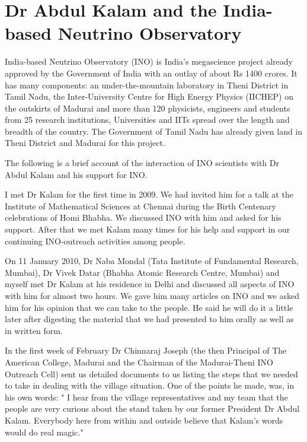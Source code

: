 \chapter{Dr Abdul Kalam and the India-based Neutrino Observatory}\label{chap19}


    

India-based Neutrino Observatory (INO) is India's megascience project
already approved by the Government of India with an outlay of about
Rs 1400 crores. It has many components: an under-the-mountain laboratory
in Theni District in Tamil Nadu, the Inter-University Centre for High
Energy Physics (IICHEP) on the outskirts of Madurai and more than 120
physicists, engineers and students from 25 research institutions, 
Universities and IITs spread over the length and breadth of the country.
The Government of Tamil Nadu has already given land in Theni District
and Madurai for this project.

The following is a brief account of the interaction of INO scientists with
Dr Abdul Kalam and his support for INO.

I met Dr Kalam for the first time in 2009. We had invited him for a talk
at the Institute of Mathematical Sciences at Chennai during the Birth 
Centenary celebrations of Homi Bhabha. We discussed INO with him and
asked for his support. After that we met Kalam many times for his help
and support in our continuing INO-outreach activities among people.

\vspace{.2cm}

On 11 January 2010, Dr Naba Mondal (Tata Institute of Fundamental Research,
Mumbai), Dr Vivek Datar (Bhabha Atomic Research Centre, Mumbai) and myself
met Dr Kalam at his residence in Delhi and discussed all aspects of INO with 
him for almost two hours. We gave him many articles on INO and we asked him
for his opinion that we can take to the people. He said he will do it
a little later after digesting the material that we had presented to him
orally as well as in written form.

In the first week of February Dr Chinnaraj Joseph (the then Principal of
The American College, Madurai and the Chairman of the Madurai-Theni INO
Outreach Cell) sent us detailed documents to us listing the steps that
we needed to take in dealing with the village situation. One of the points
he made, was, in his own words: " I hear from the village representatives
and my team that the people are very curious about the stand taken by our
former President Dr Abdul Kalam. Everybody here from within and outside
believe that Kalam's words would do real magic."


